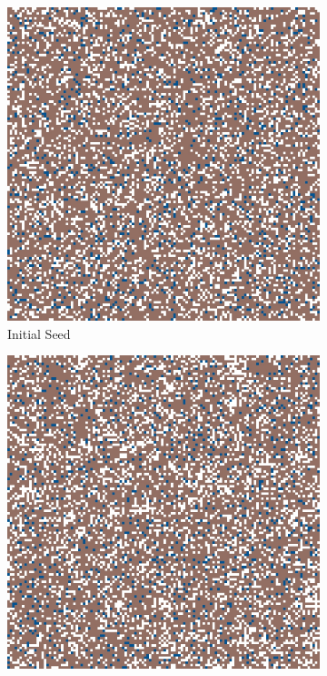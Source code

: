 \documentclass[\main/thesis.tex]{subfiles}
\begin{document}
\begin{figure}[H]
    \centering
    \begin{subfigure}[t]{.3\textwidth}
        \centering
        \includegraphics[width=\textwidth]{images/1_Equilibrium/Fig2/1_initial_seed.jpeg}
        \caption{Initial Seed}
        \label{fig:EquilibriumInitalSeed}
    \end{subfigure}
    \hfill
    \begin{subfigure}[t]{.3\textwidth}
        \centering
        \includegraphics[width=\textwidth]{images/1_Equilibrium/Fig2/2_halfway_time_step.jpeg}

\end{subfigure}
\end{figure}
\end{document}
